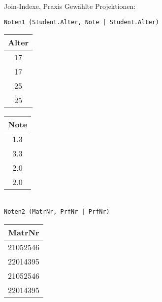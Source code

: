 \begin{frame}{Join-Indexe, Praxis}
Gew\"ahlte Projektionen:

\texttt{Noten1 (Student.Alter, Note | Student.Alter)} \\
\vspace{3mm}
\begin{tabular}{|c|}
	\hline
	Alter \\ \hline
	17    \\ \hline
	17    \\ \hline
	25    \\ \hline
	25    \\ \hline
\end{tabular}
\quad
\begin{tabular}{|c|}
	\hline
	Note \\ \hline
	1.3    \\ \hline
	3.3    \\ \hline
	2.0    \\ \hline
	2.0    \\ \hline
\end{tabular}
  \\
\vspace{5mm}
\texttt{Noten2 (MatrNr, PrfNr | PrfNr)} \\
\vspace{3mm}
\begin{tabular}{|c|}
	\hline
	MatrNr   \\ \hline
	21052546 \\ \hline
	22014395 \\ \hline
	21052546 \\ \hline
	22014395 \\ \hline
\end{tabular}

\end{frame}
